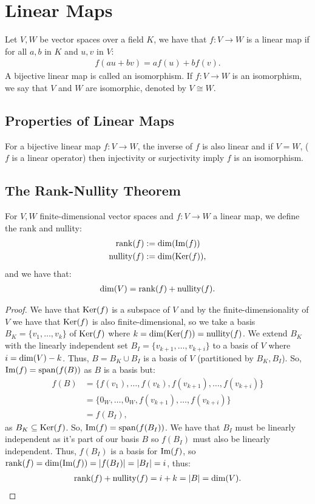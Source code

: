 \section{Linear Maps}

Let $V, W$ be vector spaces over a field $K$, we have that
$f:V \to W$ is a linear map if for all $a, b$ in $K$ and
$u, v$ in $V$: \begin{gather*}
  f(au+bv) = af(u) + bf(v).
\end{gather*} A bijective linear map is called an isomorphism.
If $f: V \to W$ is an isomorphism, we say that $V$ and $W$ are 
isomorphic, denoted by $V \cong W$. 

\subsection{Properties of Linear Maps}

For a bijective linear map $f : V \to W$, the inverse of $f$ is also linear
and if $V = W$, ($f$ is a linear operator) then injectivity or surjectivity 
imply $f$ is an isomorphism.

\subsection{The Rank-Nullity Theorem}

For $V, W$ finite-dimensional vector spaces and 
$f : V \to W$ a linear map, we define the rank and nullity: \begin{align*}
    \operatorname{rank}(f) &:= \operatorname{dim}(\operatorname{Im}(f)) \\
    \operatorname{nullity}(f) &:= \operatorname{dim}(\operatorname{Ker}(f)),
\end{align*} and we have that:
\begin{gather*}
  \operatorname{dim}(V) = \operatorname{rank}(f) + \operatorname{nullity}(f).
\end{gather*}

\begin{proof}
    We have that $\operatorname{Ker}(f)$ is a subspace of $V$ and
    by the finite-dimensionality of $V$ we have that $\operatorname{Ker}(f)$ is also
    finite-dimensional, so we take a basis $B_K = \{v_1, \ldots, v_k\}$ 
    of $\operatorname{Ker}(f)$ where $k = \operatorname{dim}(\operatorname{Ker}(f)) = \operatorname{nullity}(f)$. We extend $B_K$
    with the linearly independent set $B_I = \{v_{k + 1}, \ldots, v_{k + i}\}$
    to a basis of $V$ where $i = \operatorname{dim}(V) - k$. Thus, $B = B_K \cup B_I$
    is a basis of $V$ (partitioned by $B_K, B_I$).
    So, $\operatorname{Im}(f) = \operatorname{span}(f(B))$ as $B$ is a basis but: \begin{align*}
        f(B) 
        &= \{f(v_1), \ldots, f(v_k), f(v_{k + 1}), \ldots, f(v_{k + i})\} \\
        &= \{0_W, \ldots, 0_W, f(v_{k + 1}), \ldots, f(v_{k + i})\} \\
        &= f(B_I),
    \end{align*} as $B_K \subseteq \operatorname{Ker}(f)$. So, $\operatorname{Im}(f) = \operatorname{span}(f(B_I))$.
    We have that $B_I$ must be linearly independent as it's part of our
    basis $B$ so $f(B_I)$ must also be linearly independent. Thus, $f(B_I)$
    is a basis for $\operatorname{Im}(f)$, so $\operatorname{rank}(f) = \operatorname{dim}(\operatorname{Im}(f)) = |f(B_I)| = |B_I| = i$,
    thus: \begin{gather*}
        \operatorname{rank}(f) + \operatorname{nullity}(f) = i + k = |B| = \operatorname{dim}(V).
    \end{gather*} 
\end{proof}